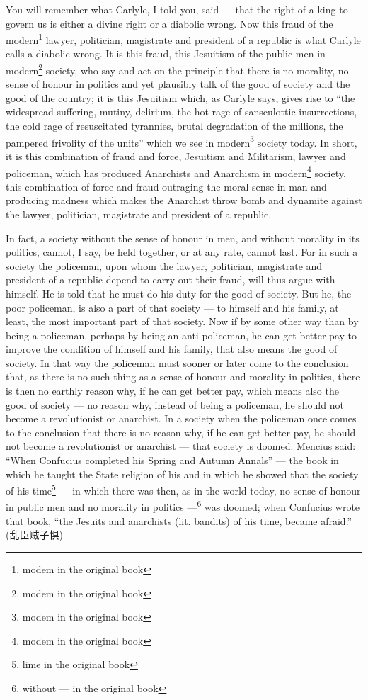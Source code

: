 You will remember what Carlyle, I told you, said --- that the right of a king to govern us is either a divine right or a diabolic wrong.
Now this fraud of the modern\footnote{modem in the original book} lawyer, politician, magistrate and president of a republic is what Carlyle calls a diabolic wrong.
It is this fraud, this Jesuitism of the public men in modern\footnote{modem in the original book} society, who say and act on the principle that there is no morality, no sense of honour in politics and yet plausibly talk of the good of society and the good of the country; it is this Jesuitism which, as Carlyle says, gives rise to ``the widespread suffering, mutiny, delirium, the hot rage of sansculottic insurrections, the cold rage of resuscitated tyrannies, brutal degradation of the millions, the pampered frivolity of the units'' which we see in modern\footnote{modem in the original book} society today.
In short, it is this combination of fraud and force, Jesuitism and Militarism, lawyer and policeman, which has produced Anarchists and Anarchism in modern\footnote{modem in the original book} society, this combination of force and fraud outraging the moral sense in man and producing madness which makes the Anarchist throw bomb and dynamite against the lawyer, politician, magistrate and president of a republic.

In fact, a society without the sense of honour in men, and without morality in its politics, cannot, I say, be held together, or at any rate, cannot last.
For in such a society the policeman, upon whom the lawyer, politician, magistrate and president of a republic depend to carry out their fraud, will thus argue with himself.
He is told that he must do his duty for the good of society.
But he, the poor policeman, is also a part of that society --- to himself and his family, at least, the most important part of that society.
Now if by some other way than by being a policeman, perhaps by being an anti-policeman, he can get better pay to improve the condition of himself and his family, that also means the good of society.
In that way the policeman must sooner or later come to the conclusion that, as there is no such thing as a sense of honour and morality in politics, there is then no earthly reason why, if he can get better pay, which means also the good of society --- no reason why, instead of being a policeman, he should not become a revolutionist or anarchist.
In a society when the policeman once comes to the conclusion that there is no reason why, if he can get better pay, he should not become a revolutionist or anarchist --- that society is doomed.
Mencius said: ``When Confucius completed his Spring and Autumn Annals'' --- the book in which he taught the State religion of his and in which he showed that the society of his time\footnote{lime in the original book} --- in which there was then, as in the world today, no sense of honour in public men and no morality in politics ---\footnote{without --- in the original book} was doomed; when Confucius wrote that book, ``the Jesuits and anarchists (lit. bandits) of his time, became afraid.'' (乱臣贼子惧)\cite{num14}

